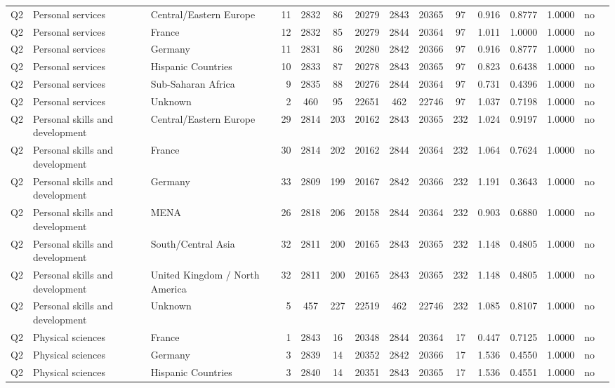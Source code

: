 \begin{longtable}{lllrcccccccccll}
Q2 & Personal services & Central/Eastern Europe & 11 & 2832 & 86 & 20279 & 2843 & 20365 & 97 & 0.916 & 0.8777 & 1.0000 & no \\
Q2 & Personal services & France & 12 & 2832 & 85 & 20279 & 2844 & 20364 & 97 & 1.011 & 1.0000 & 1.0000 & no \\
Q2 & Personal services & Germany & 11 & 2831 & 86 & 20280 & 2842 & 20366 & 97 & 0.916 & 0.8777 & 1.0000 & no \\
Q2 & Personal services & Hispanic Countries & 10 & 2833 & 87 & 20278 & 2843 & 20365 & 97 & 0.823 & 0.6438 & 1.0000 & no \\
Q2 & Personal services & Sub-Saharan Africa & 9 & 2835 & 88 & 20276 & 2844 & 20364 & 97 & 0.731 & 0.4396 & 1.0000 & no \\
Q2 & Personal services & Unknown & 2 & 460 & 95 & 22651 & 462 & 22746 & 97 & 1.037 & 0.7198 & 1.0000 & no \\
Q2 & Personal skills and development & Central/Eastern Europe & 29 & 2814 & 203 & 20162 & 2843 & 20365 & 232 & 1.024 & 0.9197 & 1.0000 & no \\
Q2 & Personal skills and development & France & 30 & 2814 & 202 & 20162 & 2844 & 20364 & 232 & 1.064 & 0.7624 & 1.0000 & no \\
Q2 & Personal skills and development & Germany & 33 & 2809 & 199 & 20167 & 2842 & 20366 & 232 & 1.191 & 0.3643 & 1.0000 & no \\
Q2 & Personal skills and development & MENA & 26 & 2818 & 206 & 20158 & 2844 & 20364 & 232 & 0.903 & 0.6880 & 1.0000 & no \\
Q2 & Personal skills and development & South/Central Asia & 32 & 2811 & 200 & 20165 & 2843 & 20365 & 232 & 1.148 & 0.4805 & 1.0000 & no \\
Q2 & Personal skills and development & United Kingdom / North America & 32 & 2811 & 200 & 20165 & 2843 & 20365 & 232 & 1.148 & 0.4805 & 1.0000 & no \\
Q2 & Personal skills and development & Unknown & 5 & 457 & 227 & 22519 & 462 & 22746 & 232 & 1.085 & 0.8107 & 1.0000 & no \\
Q2 & Physical sciences & France & 1 & 2843 & 16 & 20348 & 2844 & 20364 & 17 & 0.447 & 0.7125 & 1.0000 & no \\
Q2 & Physical sciences & Germany & 3 & 2839 & 14 & 20352 & 2842 & 20366 & 17 & 1.536 & 0.4550 & 1.0000 & no \\
Q2 & Physical sciences & Hispanic Countries & 3 & 2840 & 14 & 20351 & 2843 & 20365 & 17 & 1.536 & 0.4551 & 1.0000 & no \\

\end{longtable}
